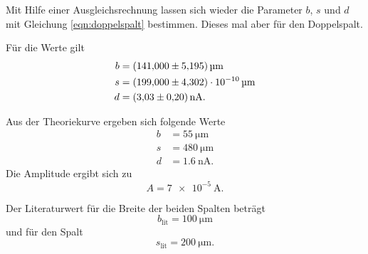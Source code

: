 \noindent Mit Hilfe einer Ausgleichsrechnung lassen sich wieder die Parameter $b$, $s$ und $d$ mit Gleichung \eqref{eqn:doppelspalt} bestimmen. Dieses mal aber für den Doppelspalt. 

\noindent Für die Werte gilt
\begin{align*}
    b &= \SI{141 \pm 5.195}{\micro\meter} \\
    s &= \SI{199\pm 4.302e-10}{\micro\meter} \\
    d &= \SI{3.03(20)}{\nano\ampere}. 
\end{align*}

\noindent Aus der Theoriekurve ergeben sich folgende Werte
\begin{align*}
    b &= \SI{55}{\micro\meter} \\
    s &= \SI{480}{\micro\meter} \\
    d &= \SI{1.6}{\nano\ampere}.
\end{align*}
Die Amplitude ergibt sich zu 
\begin{equation*}
    A = \SI{7e-5}{\ampere}. %
\end{equation*}

\noindent Der Literaturwert für die Breite der beiden Spalten beträgt
\begin{equation*}
    b_{\text{lit}} = \SI{100}{\micro\meter}
\end{equation*}
und für den Spalt 
\begin{equation*}
    s_{\text{lit}} = \SI{200}{\micro\meter}.
\end{equation*}
